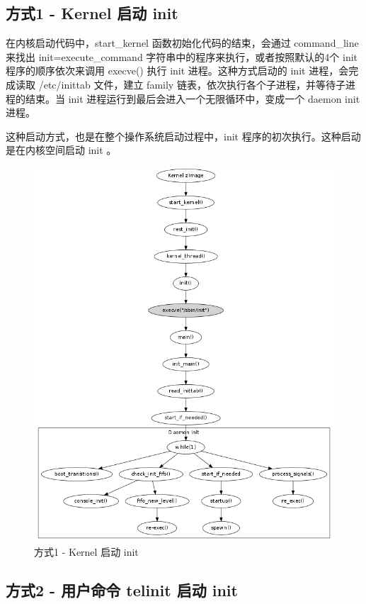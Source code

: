 \subsection{方式1 - Kernel 启动 init}

在内核启动代码中，start\_kernel 函数初始化代码的结束，会通过 command\_line
来找出 init=execute\_command 字符串中的程序来执行，或者按照默认的4个 init
程序的顺序依次来调用 execve() 执行 init 进程。这种方式启动的 init
进程，会完成读取 /etc/inittab 文件，建立 family
链表，依次执行各个子进程，并等待子进程的结束。当 init
进程运行到最后会进入一个无限循环中，变成一个 daemon init 进程。

这种启动方式，也是在整个操作系统启动过程中，init
程序的初次执行。这种启动是在内核空间启动 init 。

\begin{figure}[htbp]
\centering
\includegraphics{./figures/how-to-exec-init-1.png}
\caption{方式1 - Kernel 启动 init}
\end{figure}

\subsection{方式2 - 用户命令 telinit 启动 init}

